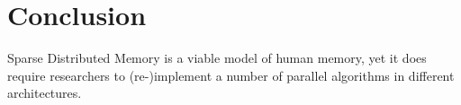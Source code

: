 





%
%




%
%
%
%










\chapter{Conclusion}

Sparse Distributed Memory is a viable model of human memory, yet it does require researchers to (re-)implement a number of parallel algorithms in different architectures.

